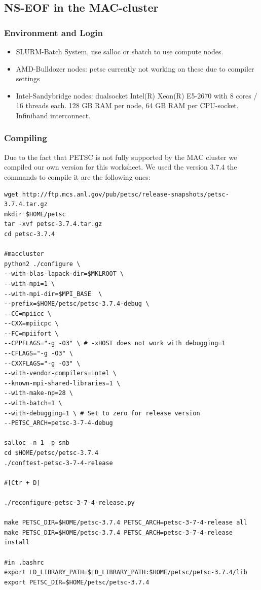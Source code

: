 \documentclass[a4paper]{article}
\begin{document}
\subsection{NS-EOF in the MAC-cluster}
\subsubsection{Environment and Login}
\begin{itemize}
	\item SLURM-Batch System, use salloc or sbatch to use compute nodes.
	\item AMD-Bulldozer nodes: petsc currently not working on these due to compiler settings
	\item Intel-Sandybridge nodes: dualsocket Intel(R) Xeon(R) E5-2670 with 8 cores / 16 threads each. 128 GB RAM per node, 64 GB RAM per CPU-socket. Infiniband interconnect.
\end{itemize}
\subsubsection{Compiling}
Due to the fact that PETSC is not fully supported by the MAC cluster we compiled our own version for this worksheet. We used the version 3.7.4 the commands to compile it are the following ones:
\begin{lstlisting}[caption=Debug version]
wget http://ftp.mcs.anl.gov/pub/petsc/release-snapshots/petsc-3.7.4.tar.gz
mkdir $HOME/petsc
tar -xvf petsc-3.7.4.tar.gz
cd petsc-3.7.4

#maccluster
python2 ./configure \
--with-blas-lapack-dir=$MKLROOT \
--with-mpi=1 \
--with-mpi-dir=$MPI_BASE  \
--prefix=$HOME/petsc/petsc-3.7.4-debug \
--CC=mpiicc \
--CXX=mpiicpc \
--FC=mpiifort \
--CPPFLAGS="-g -O3" \ # -xHOST does not work with debugging=1
--CFLAGS="-g -O3" \
--CXXFLAGS="-g -O3" \
--with-vendor-compilers=intel \
--known-mpi-shared-libraries=1 \
--with-make-np=28 \
--with-batch=1 \
--with-debugging=1 \ # Set to zero for release version
--PETSC_ARCH=petsc-3-7-4-debug

salloc -n 1 -p snb
cd $HOME/petsc/petsc-3.7.4
./conftest-petsc-3-7-4-release

#[Ctr + D]

./reconfigure-petsc-3-7-4-release.py

make PETSC_DIR=$HOME/petsc-3.7.4 PETSC_ARCH=petsc-3-7-4-release all
make PETSC_DIR=$HOME/petsc-3.7.4 PETSC_ARCH=petsc-3-7-4-release install

#in .bashrc
export LD_LIBRARY_PATH=$LD_LIBRARY_PATH:$HOME/petsc/petsc-3.7.4/lib
export PETSC_DIR=$HOME/petsc/petsc-3.7.4
\end{lstlisting}
\end{document}
